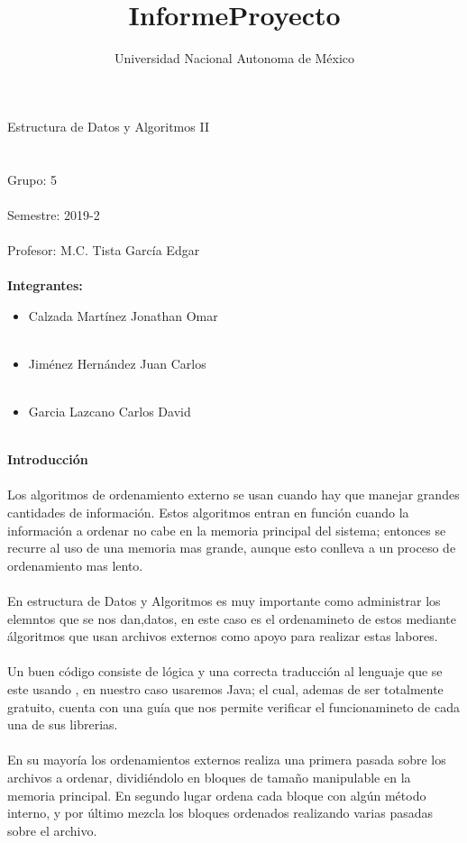 \documentclass[12pt,a4paper]{article}
\author{Universidad Nacional Autonoma de México}
\title{InformeProyecto}
\begin{document}

	\maketitle

	\huge Estructura de Datos y Algoritmos II
	\\
	\\
	\\
	\large Grupo: 5
	\\
	\\
	Semestre: 2019-2
	\\
	\\
	Profesor: M.C. Tista García Edgar
	\\
	\\
	\textbf{Integrantes:}

	\begin{itemize}
		\item Calzada Martínez Jonathan Omar
		\\
		\\
		\item Jiménez Hernández Juan Carlos
		\\
		\\
		\item Garcia Lazcano Carlos David
		\\
		\\
	\end{itemize}
	\newpage
	\huge \textbf{Introducción}
	\\
	\\
	\normalsize Los algoritmos de ordenamiento externo se usan cuando hay que manejar grandes cantidades de información. Estos algoritmos entran en función cuando la información a ordenar no cabe en la memoria principal del sistema; entonces se recurre al uso de una memoria mas grande, aunque esto conlleva a un proceso de ordenamiento mas lento.
	\\
	\\
	En estructura de Datos y Algoritmos es muy importante como administrar los elemntos que se nos dan,datos, en este caso es el ordenamineto de estos mediante álgoritmos que usan archivos externos como apoyo para realizar estas labores.
	\\
	\\
	Un buen código consiste de lógica y una correcta traducción al lenguaje que se este usando , en nuestro caso usaremos Java; el cual, ademas de ser totalmente gratuito, cuenta con una guía que nos permite verificar el funcionamineto de cada una de sus librerias.
	\\
	\\
	En su mayoría los ordenamientos externos realiza una primera pasada sobre los archivos a ordenar, dividiéndolo en bloques de tamaño manipulable en la memoria principal. En segundo lugar ordena cada bloque con algún método interno, y por último mezcla los bloques ordenados realizando varias pasadas sobre el archivo.  
\end{document}
